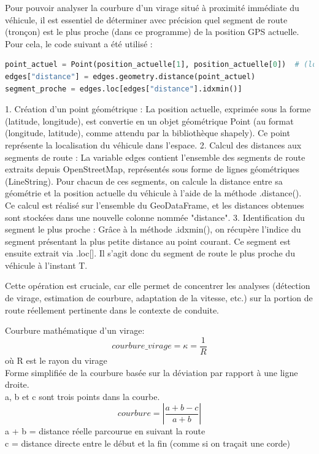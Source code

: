 Pour pouvoir analyser la courbure d’un virage situé à proximité immédiate du véhicule, il est essentiel de déterminer avec précision quel segment de route (tronçon) est le plus proche (dans ce programme) de la position GPS actuelle. Pour cela, le code suivant a été utilisé :
\begin{lstlisting}[language=Python, caption={Calcul de points}]
point_actuel = Point(position_actuelle[1], position_actuelle[0])  # (longitude, latitude)
edges["distance"] = edges.geometry.distance(point_actuel)
segment_proche = edges.loc[edges["distance"].idxmin()]
\end{lstlisting}
	1.	Création d’un point géométrique :
La position actuelle, exprimée sous la forme (latitude, longitude), est convertie en un objet géométrique Point (au format (longitude, latitude), comme attendu par la bibliothèque shapely). Ce point représente la localisation du véhicule dans l’espace.
	2.	Calcul des distances aux segments de route :
La variable edges contient l’ensemble des segments de route extraits depuis OpenStreetMap, représentés sous forme de lignes géométriques (LineString). Pour chacun de ces segments, on calcule la distance entre sa géométrie et la position actuelle du véhicule à l’aide de la méthode .distance(). Ce calcul est réalisé sur l’ensemble du GeoDataFrame, et les distances obtenues sont stockées dans une nouvelle colonne nommée "distance".
	3.	Identification du segment le plus proche :
Grâce à la méthode .idxmin(), on récupère l’indice du segment présentant la plus petite distance au point courant. Ce segment est ensuite extrait via .loc[]. Il s’agit donc du segment de route le plus proche du véhicule à l’instant T.

Cette opération est cruciale, car elle permet de concentrer les analyses (détection de virage, estimation de courbure, adaptation de la vitesse, etc.) sur la portion de route réellement pertinente dans le contexte de conduite.

\begin{tcolorbox}[title=Calcul de la courbure]
Courbure mathématique\cite{formule_curvature} d’un virage:
\[
courbure\_virage = \kappa = \frac{1}{R}
\]
où R est le rayon du virage\\
Forme simplifiée de la courbure basée sur la déviation par rapport à une ligne droite.\\
a, b et c sont trois points dans la courbe.\\
\[
courbure = \left| \frac{a + b - c}{a + b} \right|
\]
a + b = distance réelle parcourue en suivant la route \\
c = distance directe entre le début et la fin (comme si on traçait une corde)
\end{tcolorbox}


